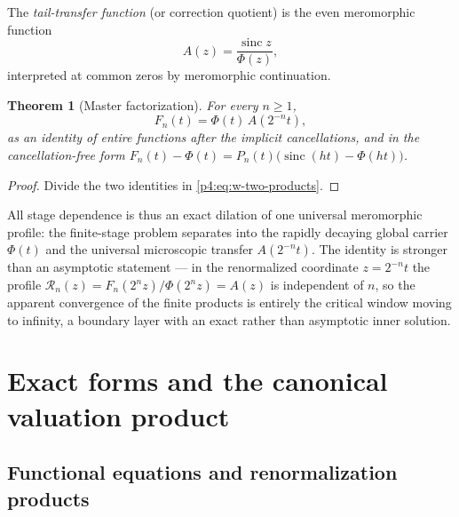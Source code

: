 \documentclass[11pt,oneside]{article}
\numberwithin{equation}{section}
\newtheorem{theorem}{Theorem}[section]
\theoremstyle{definition}
\theoremstyle{remark}
\newcommand{\sinc}{\operatorname{sinc}}
\begin{document}
\begin{definition}
\label{p4:def:w-A}
The \emph{tail-transfer function} (or correction quotient) is the even
meromorphic function
\begin{equation}
 A(z)=\frac{\sinc z}{\Phi(z)},
 \label{p4:eq:w-A-def}
\end{equation}
interpreted at common zeros by meromorphic continuation.
\end{definition}

\begin{theorem}[Master factorization]
\label{p4:thm:w-master}
For every $n\ge1$,
\begin{equation}
 F_n(t)=\Phi(t)\,A(2^{-n}t),
 \label{p4:eq:w-master}
\end{equation}
as an identity of entire functions after the implicit cancellations, and in
the cancellation-free form
$F_n(t)-\Phi(t)=P_n(t)\bigl(\sinc(ht)-\Phi(ht)\bigr)$.
\end{theorem}

\begin{proof}
Divide the two identities in \eqref{p4:eq:w-two-products}.
\end{proof}

All stage dependence is thus an exact dilation of one universal meromorphic
profile: the finite-stage problem separates into the rapidly decaying global
carrier $\Phi(t)$ and the universal microscopic transfer $A(2^{-n}t)$.  The
identity is stronger than an asymptotic statement --- in the renormalized
coordinate $z=2^{-n}t$ the profile
$\mathscr R_n(z)=F_n(2^nz)/\Phi(2^nz)=A(z)$ is independent of $n$, so the
apparent convergence of the finite products is entirely the critical window
moving to infinity, a boundary layer with an exact rather than asymptotic
inner solution.


\section{Exact forms and the canonical valuation product}
\label{p4:sec:w-forms}

\subsection{Functional equations and renormalization products}
\end{document}
